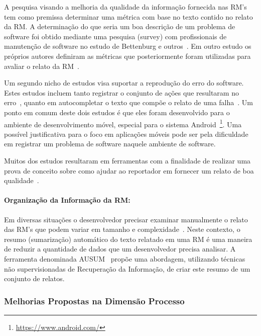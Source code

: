 A pesquisa visando a melhoria da qualidade da informação fornecida nas RM's tem
como premissa determinar uma métrica com base no texto contido no relato da RM.
A determinação do que seria um boa descrição de um problema de software foi
obtido mediante uma pesquisa (survey) com profissionais de manutenção de
software no estudo de Bettenburg e outros~\cite{Bettenburg2008a}. Em outro
estudo os próprios autores definiram as métricas que posteriormente foram
utilizadas para avaliar o relato da RM~\cite{Tu:2014:MQI:2677832.2677844}.

Um segundo nicho de estudos visa suportar a reprodução do erro do software.
Estes estudos incluem tanto registrar o conjunto de ações que resultaram no
erro~\cite{White:2015:GRR:2820282.2820291}, quanto em autocompletar o texto que
compõe o relato de uma falha~\cite{moran2015auto}. Um ponto em comum deste dois
estudos é que eles foram desenvolvido para o ambiente de desenvolvimento móvel,
especial para o sistema Android~\footnote{\url{https://www.android.com/}}. Uma
possível justificativa para o foco em aplicações móveis pode ser pela
dificuldade em registrar um problema de software naquele ambiente de software.

Muitos dos estudos resultaram em ferramentas com a finalidade de realizar uma
prova de conceito sobre como ajudar ao reportador em fornecer um relato de boa
qualidade~\cite{Tu:2014:MQI:2677832.2677844, Bettenburg2008a,
	Wu2011a,White:2015:GRR:2820282.2820291,moran2015auto}.

\paragraph{Organização da Informação da RM:}

Em diversas situações o desenvolvedor precisar examinar manualmente o relato das
RM's que podem variar em tamanho e complexidade~\cite{mani2012ausum}.  Neste
contexto, o resumo (sumarização) automático do texto relatado em uma RM é uma
maneira de reduzir a quantidade de dados que um desenvolvedor precisa analisar.
A ferramenta denominada AUSUM~\cite{mani2012ausum} propõe uma abordagem,
utilizando técnicas não supervisionadas de Recuperação da Informação, de criar
este resumo de um conjunto de relatos.

\subsubsection{Melhorias Propostas na Dimensão Processo}
\label{ssub:melhorias_dim_processo}

